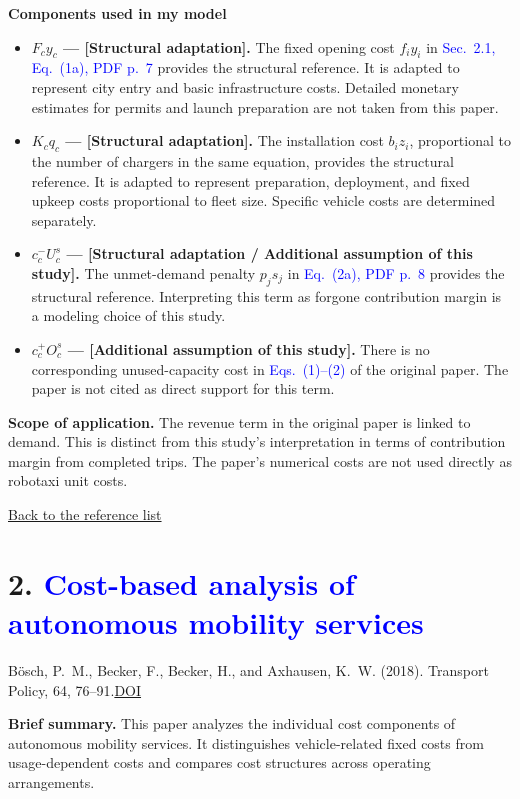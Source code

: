 \documentclass[10pt,a4paper]{article}
\newcommand{\boschtitle}{Cost-based analysis of autonomous mobility services}
\newcommand{\backtolist}{\par\smallskip\hyperlink{paper:list}{Back to the reference list}\par}
\begin{document}
\textbf{Components used in my model}
\begin{itemize}
\item \textbf{$F_cy_c$ --- [Structural adaptation].} The fixed opening cost $f_i y_i$ in \textcolor{blue}{Sec.~2.1, Eq.~(1a), PDF p.~7} provides the structural reference. It is adapted to represent city entry and basic infrastructure costs. Detailed monetary estimates for permits and launch preparation are not taken from this paper.
\item \textbf{$K_cq_c$ --- [Structural adaptation].} The installation cost $b_i z_i$, proportional to the number of chargers in the same equation, provides the structural reference. It is adapted to represent preparation, deployment, and fixed upkeep costs proportional to fleet size. Specific vehicle costs are determined separately.
\item \textbf{$c_c^-U_c^s$ --- [Structural adaptation / Additional assumption of this study].} The unmet-demand penalty $p_j s_j$ in \textcolor{blue}{Eq.~(2a), PDF p.~8} provides the structural reference. Interpreting this term as forgone contribution margin is a modeling choice of this study.
\item \textbf{$c_c^+O_c^s$ --- [Additional assumption of this study].} There is no corresponding unused-capacity cost in \textcolor{blue}{Eqs.~(1)--(2)} of the original paper. The paper is not cited as direct support for this term.
\end{itemize}
\textbf{Scope of application.} The revenue term in the original paper is linked to demand. This is distinct from this study's interpretation in terms of contribution margin from completed trips. The paper's numerical costs are not used directly as robotaxi unit costs.
\backtolist

\hypertarget{paper:bosch}{}
\section*{2. \textcolor{blue}{\boschtitle}}
{\color{blue}B\"osch, P.~M., Becker, F., Becker, H., and Axhausen, K.~W. (2018). Transport Policy, 64, 76--91.}\quad \href{https://doi.org/10.1016/j.tranpol.2017.09.005}{DOI}

\textbf{Brief summary.} This paper analyzes the individual cost components of autonomous mobility services. It distinguishes vehicle-related fixed costs from usage-dependent costs and compares cost structures across operating arrangements.
\end{document}
